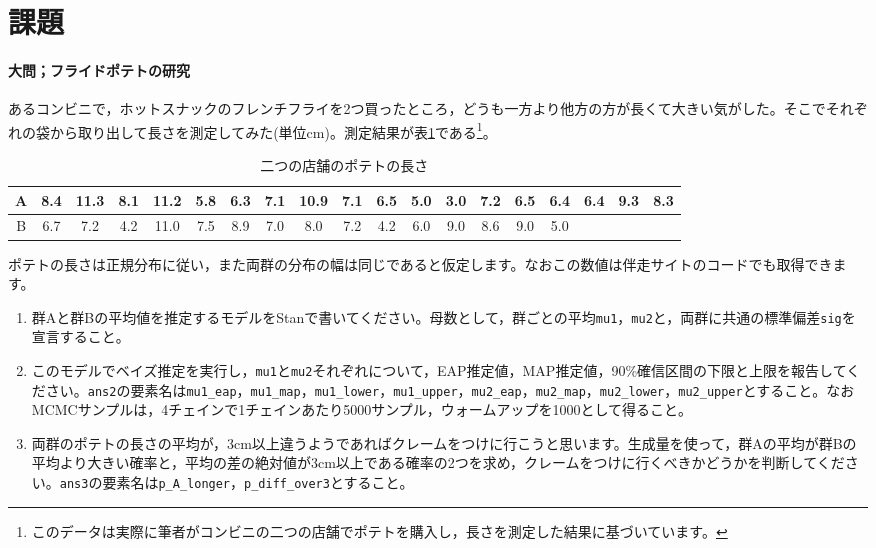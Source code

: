 \documentclass{ltjsbook}
\begin{document}
\section{課題}


\paragraph{大問；フライドポテトの研究}
あるコンビニで，ホットスナックのフレンチフライを2つ買ったところ，どうも一方より他方の方が長くて大きい気がした。そこでそれぞれの袋から取り出して長さを測定してみた(単位cm)。測定結果が表\ref{tbl:06_01}である\footnote{このデータは実際に筆者がコンビニの二つの店舗でポテトを購入し，長さを測定した結果に基づいています。}。
\begin{table}[ht]
	\center
	\caption{二つの店舗のポテトの長さ}
	\begin{tabular}{c|cccccccccccccccccc}\hline
		A & 8.4 & 11.3 & 8.1 & 11.2 & 5.8 & 6.3 & 7.1 & 10.9 & 7.1 & 6.5 & 5.0 & 3.0 & 7.2 & 6.5 & 6.4 & 6.4 & 9.3 & 8.3 \\\hline
		B & 6.7 & 7.2  & 4.2 & 11.0 & 7.5 & 8.9 & 7.0 & 8.0  & 7.2 & 4.2 & 6.0 & 9.0 & 8.6 & 9.0 & 5.0 &     &     &     \\\hline
	\end{tabular}
	\label{tbl:06_01}
\end{table}
ポテトの長さは正規分布に従い，また両群の分布の幅は同じであると仮定します。なおこの数値は伴走サイトのコードでも取得できます。
\begin{enumerate}
	\item 群Aと群Bの平均値を推定するモデルをStanで書いてください。母数として，群ごとの平均\verb|mu1|，\verb|mu2|と，両群に共通の標準偏差\verb|sig|を宣言すること。
	\item このモデルでベイズ推定を実行し，\verb|mu1|と\verb|mu2|それぞれについて，EAP推定値，MAP推定値，90\%確信区間の下限と上限を報告してください。\verb|ans2|の要素名は\verb|mu1_eap|，\verb|mu1_map|，\verb|mu1_lower|，\verb|mu1_upper|，\verb|mu2_eap|，\verb|mu2_map|，\verb|mu2_lower|，\verb|mu2_upper|とすること。なおMCMCサンプルは，4チェインで1チェインあたり5000サンプル，ウォームアップを1000として得ること。
	\item 両群のポテトの長さの平均が，3cm以上違うようであればクレームをつけに行こうと思います。生成量を使って，群Aの平均が群Bの平均より大きい確率と，平均の差の絶対値が3cm以上である確率の2つを求め，クレームをつけに行くべきかどうかを判断してください。\verb|ans3|の要素名は\verb|p_A_longer|，\verb|p_diff_over3|とすること。
\end{enumerate}
\end{document}
